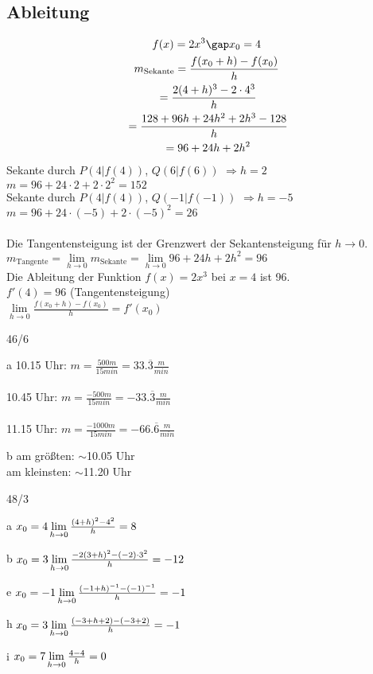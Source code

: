 \subsection{Ableitung}
\begin{gather*}
  f(x) = 2x^3\gap x_0 = 4 \\
  m_{\text{Sekante}} = \frac{f(x_0 + h) - f(x_0)}{h} \\
  \;= \frac{2(4 + h)^3 - 2 \cdot 4^3}{h} \\
  \;= \frac{128 + 96h + 24h^2 + 2h^3 - 128}{h} \\
  \;= 96 + 24h + 2h^2
\end{gather*}
Sekante durch $P(4|f(4))$, $Q(6|f(6))$ $\Rightarrow h = 2$ \\
\;$m = 96 + 24 \cdot 2 + 2 \cdot 2^2 = 152$ \\
Sekante durch $P(4|f(4))$, $Q(-1|f(-1))$ $\Rightarrow h = -5$ \\
\;$m = 96 + 24 \cdot (-5) + 2 \cdot (-5)^2 = 26$ \\\\
Die Tangentensteigung ist der Grenzwert der Sekantensteigung für $h \to 0$. \\
$m_{\text{Tangente}} = \lim\limits_{h \to 0} m_{\text{Sekante}} = \lim\limits_{h \to 0} 96 + 24h + 2h^2 = 96$ \\
Die Ableitung der Funktion $f(x) = 2x^3$ bei $x = 4$ ist 96. \\
$f'(4) = 96$ (Tangentensteigung) \\
$\lim\limits_{h \to 0} \frac{f(x_0 + h) - f(x_0)}{h} = f'(x_0)$
\begin{exercise}{46/6}
  \item [a]
  10.15 Uhr: $m = \frac{500m}{15min} = 33.\overline{3}\frac{m}{min}$ \\\\
  10.45 Uhr: $m = \frac{-500m}{15min} = -33.\overline{3}\frac{m}{min}$ \\\\
  11.15 Uhr: $m = \frac{-1000m}{15min} = -66.\overline{6}\frac{m}{min}$
  \item [b]
  am größten: $\sim$10.05 Uhr \\
  am kleinsten: $\sim$11.20 Uhr
\end{exercise}
\begin{exercise}{48/3}
  \item [a] $x_0 = 4\\ \lim\limits_{h \to 0} \frac{(4 + h)^2 - 4^2}{h} = 8$
  \item [b] $x_0 = 3\\ \lim\limits_{h \to 0} \frac{-2(3 + h)^2 - (-2) \cdot 3^2}{h} = -12$
  \item [e] $x_0 = -1\\ \lim\limits_{h \to 0} \frac{(-1 + h)^{-1} - (-1)^{-1}}{h} = -1$
  \item [h] $x_0 = 3\\ \lim\limits_{h \to 0} \frac{(-3 + h + 2) - (-3 + 2)}{h} = -1$
  \item [i] $x_0 = 7\\ \lim\limits_{h \to 0} \frac{4 - 4}{h} = 0$
\end{exercise}
